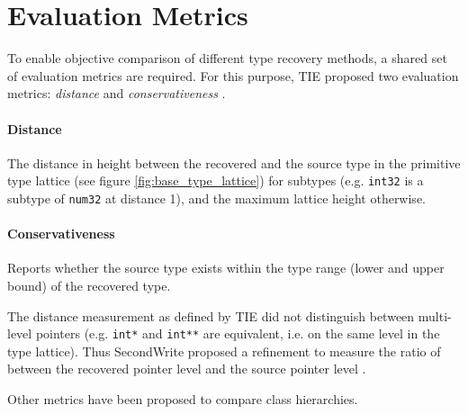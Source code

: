 
\section{Evaluation Metrics}


To enable objective comparison of different type recovery methods, a shared set of evaluation metrics are required. For this purpose, TIE proposed two evaluation metrics: \textit{distance} and \textit{conservativeness} \cite{tie_reverse_engineering_of_types}.

\paragraph{Distance} The distance in height between the recovered and the source type in the primitive type lattice (see figure \ref{fig:base_type_lattice}) for subtypes (e.g. \texttt{int32} is a subtype of \texttt{num32} at distance 1), and the maximum lattice height otherwise.

\paragraph{Conservativeness} Reports whether the source type exists within the type range (lower and upper bound) of the recovered type.

The distance measurement as defined by TIE did not distinguish between multi-level pointers (e.g. \texttt{int*} and \texttt{int**} are equivalent, i.e. on the same level in the type lattice). Thus SecondWrite proposed a refinement to measure the ratio of between the recovered pointer level and the source pointer level \cite{second_write_scalable_type_detection}.

Other metrics have been proposed to compare class hierarchies.
